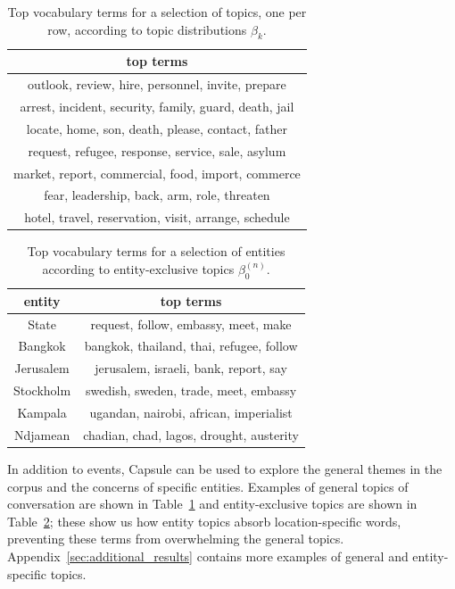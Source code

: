 \begin{table}
\centering
\small
\begin{tabular}{c}
\toprule
top terms \\
\midrule
outlook, review, hire, personnel, invite, prepare \\
arrest, incident, security, family, guard, death, jail \\
locate, home, son, death, please, contact, father \\
request, refugee, response, service, sale, asylum \\
market, report, commercial, food, import, commerce \\
fear, leadership, back, arm, role, threaten \\
hotel, travel, reservation, visit, arrange, schedule \\
\bottomrule
\end{tabular}
\label{tab:topics}
\caption{Top vocabulary terms for a selection of topics, one per row, according to topic distributions $\beta_k$.}
\end{table}

\begin{table}
\centering
\small
\begin{tabular}{cc}
\toprule
entity & top terms \\
\midrule
State & request, follow, embassy, meet, make \\
Bangkok & bangkok, thailand, thai, refugee, follow \\
Jerusalem & jerusalem, israeli, bank, report, say \\
Stockholm & swedish, sweden, trade, meet, embassy \\
Kampala & ugandan, nairobi, african, imperialist \\
Ndjamean & chadian, chad, lagos, drought, austerity \\
\bottomrule
\end{tabular}
\label{tab:entities}
\caption{Top vocabulary terms for a selection of entities according to entity-exclusive topics $\beta^{(n)}_0$.}
\end{table}

In addition to events, Capsule can be used to explore the general themes in the corpus and the concerns of specific entities.  Examples of general topics of conversation are shown in Table~\ref{tab:topics} and entity-exclusive topics are shown in Table~\ref{tab:entities}; these show us how entity topics absorb location-specific words, preventing these terms from overwhelming the general topics.  Appendix~\ref{sec:additional_results} contains more examples of general and entity-specific topics.

